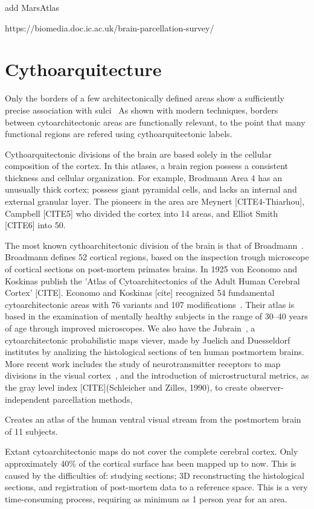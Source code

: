 add MarsAtlas

https://biomedia.doc.ic.ac.uk/brain-parcellation-survey/


\section{Cythoarquitecture}
\label{sec:cyto_maps}
Only the borders of a few architectonically defined areas show a sufficiently precise association with sulci~\cite{Amunts2007}
As shown with modern techniques, borders between cytoarchitectonic areas are functionally relevant, to the point that many functional regions are refered using cythoarquitectonic labels.

Cythoarquitectonic divisions of the brain are based solely in the cellular
composition of the cortex. In this atlases, a brain region possess a consistent
thickness and cellular organization. For example, Brodmann Area 4 has an unusually
thick cortex; possess giant pyramidal cells, and lacks an internal and external
granular layer. The pioneers in the area are Meynert [CITE4-Thiarhou],
Campbell [CITE5] who divided the cortex into 14 areas, and Elliot Smith [CITE6]
into 50.

The most known cythoarchitectonic division of the brain is that
of Broadmann~\cite{Brodmann1909}. Broadmann defines 52 cortical regions, based
on the inspection trough microscope of cortical sections on post-mortem
primates brains. In 1925 von Economo and Koskinas publish the 'Atlas of 
Cytoarchitectonics of the Adult Human Cerebral Cortex' [CITE]. Economo and
Koskinas [cite] recognized 54 fundamental cytoarchitectonic areas with 76
variants and 107 modifications~\cite{Triarhou2007}. Their atlas is based in the
examination of mentally healthy subjects in the range of 30–40 years of age
through improved microscopes. We also have the Jubrain~\cite{Mohlberg2012}, a
cytoarchitectonic probabilistic maps viever, made by Juelich and Duesseldorf
institutes by analizing the histological sections of ten human postmortem brains.
More recent work includes the study of
neurotransmitter receptors to map divisions in the visual cortex~\cite{Eickhoff2008}, 
and the introduction of microstructural metrics, as the gray level index
[CITE](Schleicher and Zilles, 1990), to create observer-independent parcellation
methods, 

Creates an atlas of the human ventral visual stream from the postmortem brain
of 11 subjects\cite{Rosenke2018}.
    
Extant cytoarchitectonic maps do not cover the complete cerebral cortex. 
Only approximately 40\% of the cortical surface has been mapped up to now. 
This is caused by the difficulties of: studying sections; 3D reconstructing the
histological sections, and registration of post-mortem data to a reference space.
This is a very time-consuming process, requiring as minimum as 1 person year for
an area.


